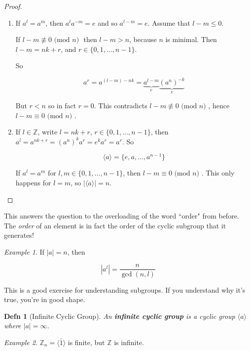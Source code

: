\documentclass[12pt]{article}
\def\Z{{\mathbb Z}}
\newcommand{\lr}[1]{\langle #1 \rangle}
\renewcommand{\mod}[1]{\text{ (mod $#1$) }}
\newtheorem{definition}{Defn}
\theoremstyle{remark}
\theoremstyle{remark}
\theoremstyle{remark}
\newtheorem{example}{Example}
\theoremstyle{remark}
\theoremstyle{remark}
\begin{document}
\begin{proof}
  \begin{enumerate}
    \item If $a^l = a^m$, then $a^la^{-m} = e$ and so $a^{l - m} = e$. Assume that
          $l - m \le 0$.

          If $l - m \not\equiv 0 \mod n$ then $l - m > n$, because $n$ is minimal.
          Then $l - m = nk + r$, and $r \in \{0, 1, \dots, n - 1\}$.

          So

          \[
            a^r = a^{(l - m) - nk} = \underbrace{a^{l - m}}_{e} \underbrace{(a^n)^{-k}}_{e}
          \]

          But $r < n$ so in fact $r = 0$. This contradicts $l - m \not\equiv 0 \mod
            n$, hence $l - m \equiv 0 \mod n$.

    \item If $l \in \Z$, write $l = nk + r$, $r \in \{0, 1, \dots, n - 1\}$, then
          $a^l = a^{nk + r} = (a^n)^ka^r = e^ka^r = a^r$. So

          \[
            \lr{a} = \{e, a, \dots, a^{n - 1}\}
          \]

          If $a^l = a^m$ for $l, m \in \{0, 1, \dots, n - 1\}$, then $l - m \equiv 0
            \mod n$. This only happens for $l = m$, so $|\lr{a}| = n$.
  \end{enumerate}
\end{proof}

This answers the question to the overloading of the word ``order" from before.
The {\it order} of an element is in fact the order of the cyclic subgroup that
it generates!

\begin{example}
	If $|a| = n$, then

	\[
		|a^l| = \frac{n}{\gcd(n, l)}
	\]

	This is a good exercise for understanding subgroups. If you understand why
	it's true, you're in good shape.
\end{example}

\begin{definition}[Infinite Cyclic Group]
	An {\bf infinite cyclic group} is a cyclic group $\lr{a}$ where $|a| = \infty$.
\end{definition}

\begin{example}
	$\Z_n = \lr{ \bar 1 }$ is finite, but $\Z$ is infinite.
\end{example}
\end{document}
